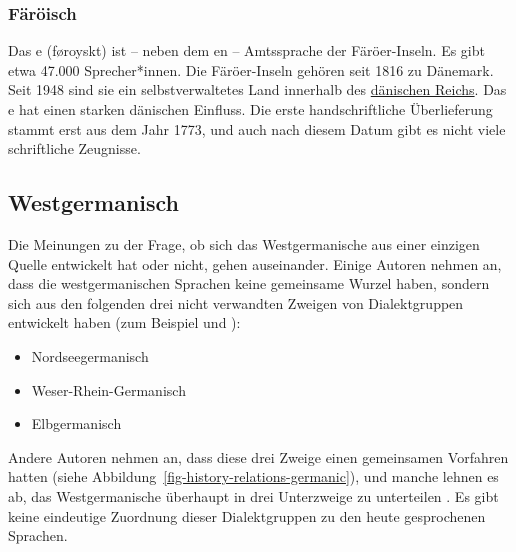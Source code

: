 \subsubsection{Färöisch}

Das e (føroyskt) ist -- neben dem en -- Amtssprache der Färöer-Inseln. Es
gibt etwa 47.000 Sprecher*innen. Die Färöer-Inseln gehören seit 1816 zu Dänemark. Seit 1948 sind sie
ein selbstverwaltetes Land innerhalb des \href{https://en.wikipedia.org/wiki/Danish_Realm}{dänischen Reichs}.
Das e hat einen starken dänischen Einfluss. Die erste handschriftliche Überlieferung stammt erst aus dem Jahr 1773, und
auch nach diesem Datum gibt es nicht viele schriftliche Zeugnisse.%

\subsection{Westgermanisch}


Die Meinungen zu der Frage, ob sich das Westgermanische aus einer einzigen Quelle entwickelt hat oder nicht, gehen auseinander. Einige Autoren
nehmen an, dass die westgermanischen Sprachen keine gemeinsame Wurzel haben, sondern sich aus den
folgenden drei nicht verwandten Zweigen von Dialektgruppen entwickelt haben (zum Beispiel \citealp[--18]{Robinson1992a-u} und
\citealp[]{HvDA94a}):
\begin{itemize}
\item Nordseegermanisch %
\item Weser-Rhein-Germanisch %
\item Elbgermanisch %
\end{itemize}
Andere Autoren nehmen an, dass diese drei Zweige einen gemeinsamen Vorfahren hatten (siehe
Abbildung~\ref{fig-history-relations-germanic}), und manche lehnen es ab, das Westgermanische überhaupt in
drei Unterzweige zu unterteilen \citep{Stiles2013a-u}.
Es gibt keine eindeutige Zuordnung dieser Dialektgruppen zu den heute gesprochenen Sprachen.%

